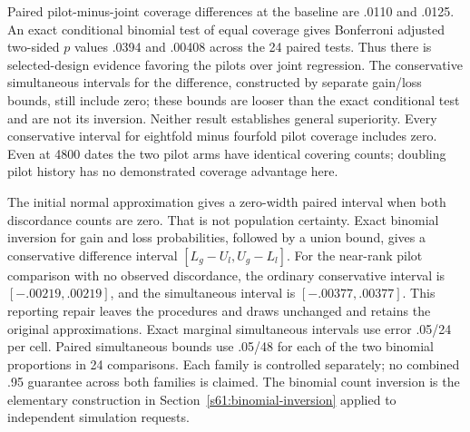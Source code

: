 Paired pilot-minus-joint coverage differences at the baseline are .0110 and
.0125. An exact conditional binomial test of equal coverage gives Bonferroni
adjusted two-sided $p$ values .0394 and .00408 across the 24 paired tests.
Thus there is selected-design evidence favoring the pilots over joint
regression. The conservative simultaneous intervals for the difference,
constructed by separate gain/loss bounds, still include zero; these bounds
are looser than the exact conditional test and are not its inversion.
Neither result establishes general superiority. Every conservative interval
for eightfold minus fourfold pilot coverage includes zero. Even at 4800 dates
the two pilot arms have identical covering counts; doubling pilot history
has no demonstrated coverage advantage here.

The initial normal approximation gives a zero-width paired interval when
both discordance counts are zero. That is not population certainty. Exact
binomial inversion for gain and loss probabilities, followed by a union
bound, gives a conservative difference interval $[L_g-U_l,U_g-L_l]$.
For the near-rank pilot comparison with no observed discordance, the ordinary
conservative interval is $[-.00219,.00219]$, and the simultaneous interval
is $[-.00377,.00377]$. This reporting repair leaves the procedures and draws
unchanged and retains the original approximations. Exact marginal simultaneous
intervals use error .05/24 per cell. Paired simultaneous bounds use .05/48
for each of the two binomial proportions in 24 comparisons. Each family is
controlled separately; no combined .95 guarantee across both families is
claimed. The binomial count inversion is the elementary construction in
Section~\ref{s61:binomial-inversion} applied to independent simulation requests.

